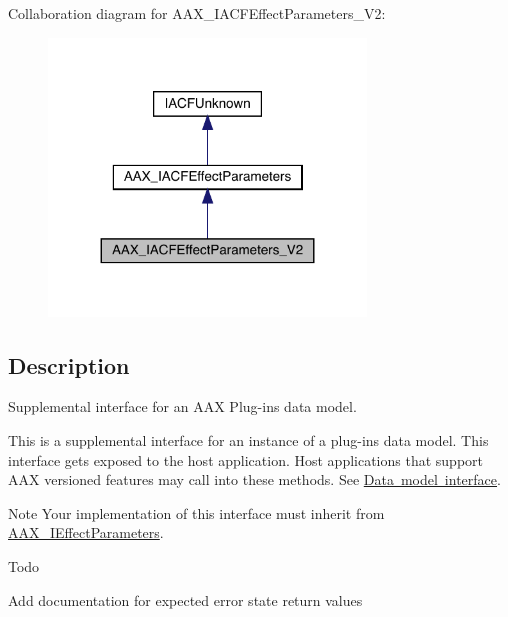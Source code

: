 Collaboration diagram for A\+A\+X\+\_\+\+I\+A\+C\+F\+Effect\+Parameters\+\_\+\+V2\+:
\nopagebreak
\begin{figure}[H]
\begin{center}
\leavevmode
\includegraphics[width=239pt]{a01675}
\end{center}
\end{figure}


\subsection{Description}
Supplemental interface for an A\+AX Plug-\/in\textquotesingle{}s data model. 

This is a supplemental interface for an instance of a plug-\/in\textquotesingle{}s data model. This interface gets exposed to the host application. Host applications that support A\+AX versioned features may call into these methods. See \mbox{\hyperlink{a00798}{Data model interface}}.

\begin{DoxyNote}{Note}
Your implementation of this interface must inherit from \mbox{\hyperlink{a01825}{A\+A\+X\+\_\+\+I\+Effect\+Parameters}}.
\end{DoxyNote}
\begin{DoxyRefDesc}{Todo}
\item[\mbox{\hyperlink{a00785__todo000032}{Todo}}]Add documentation for expected error state return values\end{DoxyRefDesc}
